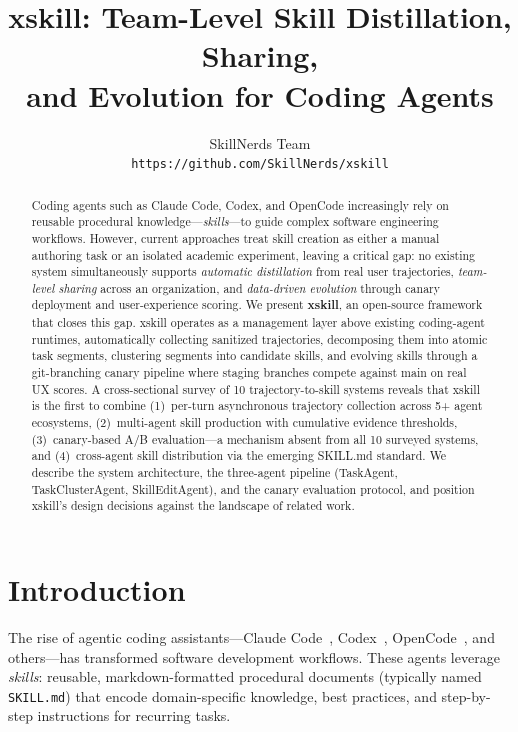 \documentclass[11pt]{article}
\title{xskill: Team-Level Skill Distillation, Sharing,\\ and Evolution for Coding Agents}
\author{
  SkillNerds Team \\
  \texttt{https://github.com/SkillNerds/xskill}
}
\begin{document}
\maketitle

\begin{abstract}
Coding agents such as Claude Code, Codex, and OpenCode increasingly rely on reusable procedural knowledge---\emph{skills}---to guide complex software engineering workflows. However, current approaches treat skill creation as either a manual authoring task or an isolated academic experiment, leaving a critical gap: no existing system simultaneously supports \emph{automatic distillation} from real user trajectories, \emph{team-level sharing} across an organization, and \emph{data-driven evolution} through canary deployment and user-experience scoring. We present \textbf{xskill}, an open-source framework that closes this gap. xskill operates as a management layer above existing coding-agent runtimes, automatically collecting sanitized trajectories, decomposing them into atomic task segments, clustering segments into candidate skills, and evolving skills through a git-branching canary pipeline where staging branches compete against main on real UX scores. A cross-sectional survey of 10 trajectory-to-skill systems reveals that xskill is the first to combine (1)~per-turn asynchronous trajectory collection across 5+ agent ecosystems, (2)~multi-agent skill production with cumulative evidence thresholds, (3)~canary-based A/B evaluation---a mechanism absent from all 10 surveyed systems, and (4)~cross-agent skill distribution via the emerging SKILL.md standard. We describe the system architecture, the three-agent pipeline (TaskAgent, TaskClusterAgent, SkillEditAgent), and the canary evaluation protocol, and position xskill's design decisions against the landscape of related work.
\end{abstract}

\section{Introduction}
\label{sec:intro}

The rise of agentic coding assistants---Claude Code~\citep{anthropic2025claude}, Codex~\citep{openai2025codex}, OpenCode~\citep{sst2025opencode}, and others---has transformed software development workflows. These agents leverage \emph{skills}: reusable, markdown-formatted procedural documents (typically named \texttt{SKILL.md}) that encode domain-specific knowledge, best practices, and step-by-step instructions for recurring tasks.
\end{document}
